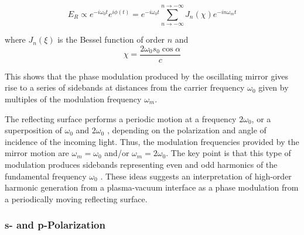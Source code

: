 \documentclass[12pt]{article}
\begin{document}
\begin{equation}
    E_R \propto e^{-i\omega_0 t}e^{i\phi(t)} =  e^{-i\omega_0 t} \sum _{n \to -\infty}^{n \to -\infty}J_n(\chi) e^{-in\omega_m t}
\end{equation}

where $J_n(\xi)$ is the Bessel function of order $n$ and
\begin{equation}
    \label{eq:chi-def}
    \chi = \frac{2\omega_0s_0\cos\alpha}{c}
\end{equation}

This shows that the phase modulation produced by the oscillating mirror gives rise to a series of sidebands at distances from the carrier frequency $\omega_0$ given by multiples of the modulation frequency $\omega_m$.

The reflecting surface performs a periodic motion at a frequency $2\omega_0$, or a superposition of $\omega_0$ and $2\omega_0$ , depending on the polarization and angle of incidence of the incoming light. Thus, the modulation frequencies provided by the mirror motion are $\omega_m = \omega_0$ and/or $\omega_m = 2\omega_0$. The key point is that this type of modulation produces sidebands representing even and odd harmonics of the fundamental frequency $\omega_0$ . These ideas suggests an interpretation of high-order harmonic generation from a plasma-vacuum interface as a phase modulation from a periodically moving reflecting surface.

\subsubsection{s- and p-Polarization}
\end{document}
